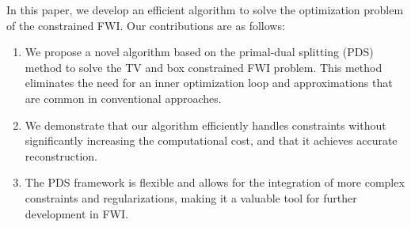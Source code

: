 In this paper, we develop an efficient algorithm to solve the optimization problem of the constrained FWI. Our contributions are as follows:
\begin{enumerate}
      \item We propose a novel algorithm based on the primal-dual splitting (PDS) method to solve the TV and box constrained FWI problem.
            This method eliminates the need for an inner optimization loop and approximations that are common in conventional approaches.
      \item We demonstrate that our algorithm efficiently handles constraints without significantly increasing the computational cost, and that it achieves accurate reconstruction.
      \item The PDS framework is flexible and allows for the integration of more complex constraints and regularizations, making it a valuable tool for further development in FWI.
\end{enumerate}


